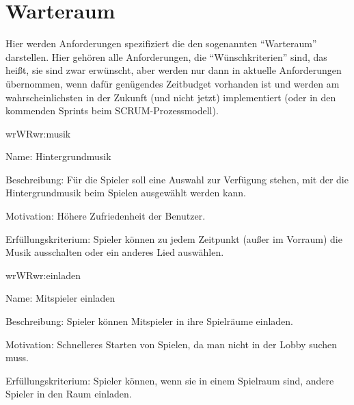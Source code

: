 \chapter{Warteraum}

Hier werden Anforderungen spezifiziert die den sogenannten ``Warteraum'' darstellen. Hier gehören alle Anforderungen, die ``Wünschkriterien'' sind, das heißt, sie sind zwar erwünscht, aber werden nur dann in aktuelle Anforderungen übernommen, wenn dafür genügendes Zeitbudget vorhanden ist und werden am wahrscheinlichsten in der Zukunft (und nicht jetzt) implementiert (oder in den kommenden Sprints beim SCRUM-Prozessmodell).

\setcounter{wr}{10}

\begin{description}[leftmargin=5em, style=sameline]	
	\begin{lhp}{wr}{WR}{wr:musik}
		\item [Name:] Hintergrundmusik
		\item [Beschreibung:] Für die Spieler soll eine Auswahl zur Verfügung stehen, mit der die Hintergrundmusik beim Spielen ausgewählt werden kann.
		\item [Motivation:] Höhere Zufriedenheit der Benutzer.
		\item [Erfüllungskriterium:] Spieler können zu jedem Zeitpunkt (außer im Vorraum) die Musik ausschalten oder ein anderes Lied auswählen.
	\end{lhp}
	
	\begin{lhp}{wr}{WR}{wr:einladen}
		\item [Name:] Mitspieler einladen
		\item [Beschreibung:] Spieler können Mitspieler in ihre Spielräume einladen.
		\item [Motivation:] Schnelleres Starten von Spielen, da man nicht in der Lobby suchen muss.
		\item [Erfüllungskriterium:] Spieler können, wenn sie in einem Spielraum sind, andere Spieler in den Raum einladen.
	\end{lhp}
	
\end{description}